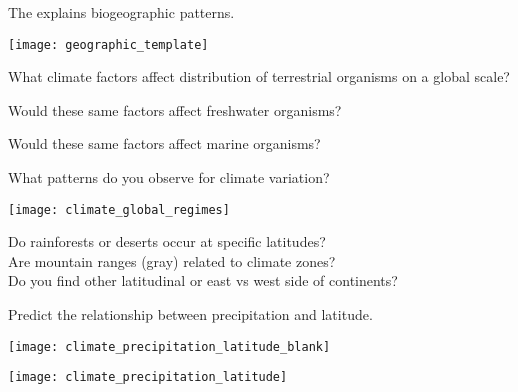 \documentclass[t]{beamer}
\begin{document}

\begin{frame}[t,plain]{The  explains biogeographic patterns.}
	\begin{center}
		\texttt{[image: geographic\_template]}
	\end{center}
\end{frame}

\begin{frame}[t,plain]
	\hangpara What climate factors affect distribution of terrestrial organisms on a global scale?

	\hangpara Would these same factors affect freshwater organisms?

	\hangpara Would these same factors affect marine organisms?
\end{frame}


\begin{frame}[t,plain]{What patterns do you observe for climate variation?}

	\vspace{-0.5\baselineskip}
	\begin{center}
		\texttt{[image: climate\_global\_regimes]}
	\end{center}
	
	\vspace{-1.5\baselineskip}
	\hangpara Do rainforests or deserts occur at specific latitudes?\\Are mountain ranges (gray) related to climate zones?\\Do you find other latitudinal or east vs west side of continents?
	
\end{frame}

\begin{frame}[t,plain]{Predict the relationship between precipitation and latitude.}

	\begin{center}
		\texttt{[image: climate\_precipitation\_latitude\_blank]}
	\end{center}

\end{frame}

\begin{frame}[t,plain]

	\begin{center}
		\texttt{[image: climate\_precipitation\_latitude]}
	\end{center}

\end{frame}
\end{document}
